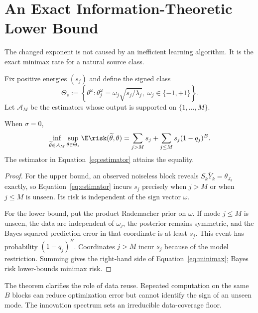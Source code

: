 \section{An Exact Information-Theoretic Lower Bound}

The changed exponent is not caused by an inefficient learning algorithm. It
is the exact minimax rate for a natural source class.

Fix positive energies $(s_j)$ and define the signed class
\begin{equation}
\Theta_s
:=\left\{\theta^\omega:
\theta_j^\omega=\omega_j\sqrt{s_j/\lambda_j},\;
\omega_j\in\{-1,+1\}\right\}.
\label{eq:signed-class}
\end{equation}
Let $\mathcal A_M$ be the estimators whose output is supported on
$\{1,\ldots,M\}$.

\begin{theorem}
\label{thm:minimax}
When $\sigma=0$,
\begin{equation}
\inf_{\widetilde\theta\in\mathcal A_M}
\sup_{\theta\in\Theta_s}
\E\risk(\widetilde\theta,\theta)
=
\sum_{j>M}s_j+\sum_{j\le M}s_j(1-q_j)^B.
\label{eq:minimax}
\end{equation}
The estimator in Equation~\eqref{eq:estimator} attains the equality.
\end{theorem}

\begin{proof}
For the upper bound, an observed noiseless block reveals
$S_k\overline Y_k=\theta_{J_k}$ exactly, so
Equation~\eqref{eq:estimator} incurs $s_j$ precisely when $j>M$ or when
$j\le M$ is unseen. Its risk is independent of the sign vector $\omega$.

For the lower bound, put the product Rademacher prior on $\omega$. If mode
$j\le M$ is unseen, the data are independent of $\omega_j$, the posterior
remains symmetric, and the Bayes squared prediction error in that coordinate
is at least $s_j$. This event has probability $(1-q_j)^B$. Coordinates
$j>M$ incur $s_j$ because of the model restriction. Summing gives the
right-hand side of Equation~\eqref{eq:minimax}; Bayes risk lower-bounds
minimax risk.
\end{proof}

The theorem clarifies the role of data reuse. Repeated computation on the same
$B$ blocks can reduce optimization error but cannot identify the sign of an
unseen mode. The innovation spectrum sets an irreducible data-coverage floor.


